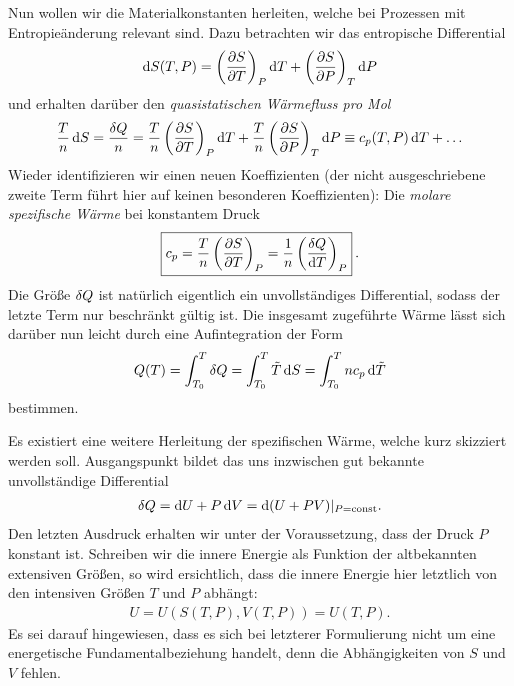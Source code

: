 Nun wollen wir die Materialkonstanten herleiten, welche bei Prozessen mit Entropieänderung relevant sind.
Dazu betrachten wir das entropische Differential
\begin{align*}
    \mathop{}\!\mathrm{d} S (T,P)= \left( \frac{\partial S}{\partial T}\right)_P \mathop{}\!\mathrm{d} T+\left( \frac{\partial S}{\partial P}\right)_T \mathop{}\!\mathrm{d} P
\end{align*}
und erhalten darüber den \emph{quasistatischen Wärmefluss pro Mol}
\begin{align*}
    \frac{T}{\sm}\diff S=\frac{\udiff Q}{\sm}=\frac{T}{\sm}\left( \frac{\partial S}{\partial T}\right)_P \diff T+\frac{T}{\sm}\left( \frac{\partial S}{\partial P}\right)_T \diff P\equiv c_p(T,P)\diff T+\ldots %
\end{align*}
Wieder identifizieren wir einen neuen Koeffizienten (der nicht ausgeschriebene zweite Term führt hier auf keinen besonderen Koeffizienten): Die \emph{molare spezifische Wärme} bei konstantem Druck
\begin{align*}
    \boxed{c_p=\frac{T}{n} \left( \frac{\partial S}{\partial T} \right)_P= \frac{1}{n} \left( \frac{\mathop{}\!\delta Q}{\mathop{}\!\mathrm{d} T} \right)_P }\:.
\end{align*}
Die Größe $\mathop{}\!\delta Q$ ist natürlich eigentlich ein unvollständiges Differential, sodass der letzte Term nur beschränkt gültig ist. 
Die insgesamt zugeführte Wärme lässt sich darüber nun leicht durch eine Aufintegration der Form
\begin{align*}
    Q(T)=\int_{T_0}^{T} \mathop{}\!\delta Q = \int_{T_0}^{T}\Tilde{T} \mathop{}\!\mathrm{d} S = \int_{T_0}^{T}n c_p\mathop{}\!\mathrm{d} \Tilde{T}
\end{align*}
bestimmen.

Es existiert eine weitere Herleitung der spezifischen Wärme, welche kurz skizziert werden soll. Ausgangspunkt bildet das uns inzwischen gut bekannte unvollständige Differential
\begin{align*}
    \mathop{}\!\delta Q=\mathop{}\!\mathrm{d} U +P\mathop{}\!\mathrm{d} V= \mathop{}\!\mathrm{d}(U+PV)|_{P=\mathrm{const}}.
\end{align*}
Den letzten Ausdruck erhalten wir unter der Voraussetzung, dass der Druck $P$ konstant ist. Schreiben wir die innere Energie als Funktion der altbekannten extensiven Größen, so wird ersichtlich, dass die innere Energie hier letztlich von den intensiven Größen $T$ und $P$ abhängt:
\begin{align*}
    U=U(S(T,P),V(T,P))=U(T,P).
\end{align*}
Es sei darauf hingewiesen, dass es sich bei letzterer Formulierung nicht um eine energetische Fundamentalbeziehung handelt, denn die Abhängigkeiten von $S$ und $V$ fehlen.


